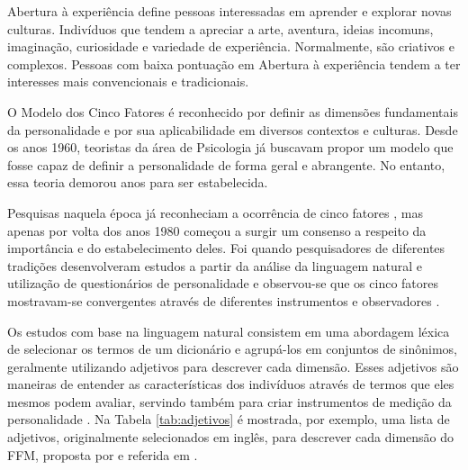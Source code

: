 Abertura à experiência define pessoas interessadas em aprender e explorar novas culturas. Indivíduos que tendem a apreciar a arte, aventura, ideias incomuns, imaginação, curiosidade e variedade de experiência. Normalmente, são criativos e complexos. Pessoas com baixa pontuação em Abertura à experiência tendem a ter interesses mais convencionais e tradicionais.

O Modelo dos Cinco Fatores é reconhecido por definir as dimensões fundamentais da personalidade e por sua aplicabilidade em diversos contextos e culturas. Desde os anos 1960, teoristas da área de Psicologia já buscavam propor um modelo que fosse capaz de definir a personalidade de forma geral e abrangente. No entanto, essa teoria demorou anos para ser estabelecida.

Pesquisas naquela época já reconheciam a ocorrência de cinco fatores \cite{tupes:61} \cite{norman:63}, mas apenas por volta dos anos 1980 começou a surgir um consenso a respeito da importância e do estabelecimento deles. Foi quando pesquisadores de diferentes tradições desenvolveram estudos a partir da análise da linguagem natural e utilização de questionários de personalidade e observou-se que os cinco fatores mostravam-se convergentes através de diferentes instrumentos e observadores \cite{mccrae:92}.

Os estudos com base na linguagem natural consistem em uma abordagem léxica de selecionar os termos de um dicionário %
e agrupá-los em conjuntos de sinônimos, geralmente utilizando adjetivos para descrever cada dimensão. Esses adjetivos são maneiras de entender as características dos indivíduos através de termos que eles mesmos podem avaliar, servindo também para criar instrumentos de medição da personalidade \cite{goldberg:83} \cite{mccrae:85}. Na Tabela \ref{tab:adjetivos} é mostrada, por exemplo, uma lista de adjetivos, originalmente selecionados em inglês, para descrever cada dimensão do FFM, proposta por \cite{john:89} e referida em \cite{mccrae:92}.

